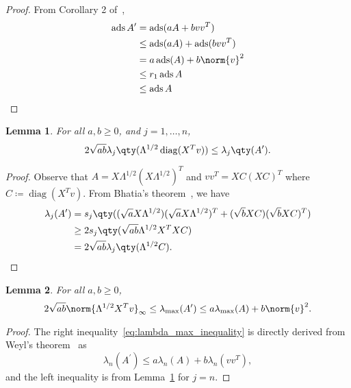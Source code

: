 \documentclass[nobib]{my-handout}
\newtheorem{lemma}{Lemma}
\theoremstyle{definition}
\theoremstyle{remark}
\DeclareMathOperator{\ads}{ads}
\DeclareMathOperator{\diag}{diag}
\begin{document}
\begin{proof}
	From Corollary 2 of~\cite{merikoski_inequalities_2004},
	\begin{equation*}
		\begin{aligned}
			\ads{A^\prime} &= \ads(a A + b v v^T) \\
										 &\le \ads(a A) + \ads(b v v^T) \\
										 &= a \ads(A) + b \norm{v}^2 \\
										 &\le r_1 \ads{A} \\
										 &\le \ads{A}
		\end{aligned}
	\end{equation*}
\end{proof}

\begin{lemma}\label{lem:mod_bhatia}
	For all $a, b \ge 0$, and $j=1,\dotsc,n$,
	\begin{equation*}
		2 \sqrt{ab} \lambda_j \qty(\Lambda^{1/2} \diag(X^T v)) \le
		\lambda_j \qty(A^\prime).
	\end{equation*}
\end{lemma}

\begin{proof}
	Observe that $A = X \Lambda^{1/2} (X \Lambda^{1/2})^T$ and $v v^T = X C (X
	C)^T$ where $C \coloneqq \diag(X^T v)$. From Bhatia's
	theorem~\cite{bhatia_singular_1990}, we have 
	\begin{equation*}
		\begin{aligned}
			\lambda_j (A^\prime)
			&= s_j \qty((\sqrt{a} X \Lambda^{1/2})(\sqrt{a} X \Lambda^{1/2})^T +
			(\sqrt{b} X C)(\sqrt{b} X C)^T) \\
			&\ge 2 s_j \qty(\sqrt{ab} \Lambda^{1/2} X^T X C) \\
			&= 2 \sqrt{ab} \lambda_j \qty(\Lambda^{1/2} C).
		\end{aligned}
	\end{equation*}
\end{proof}

\begin{lemma}\label{lem:bounding_lambda_max}
	For all $a, b \ge 0$,
	\begin{equation}\label{eq:lambda_max_inequality}
		2 \sqrt{ab} \norm{\Lambda^{1/2} X^T v}_{\infty} \le
		\lambda_{\max}(A^\prime) \le a \lambda_{\max}(A) + b \norm{v}^2.
	\end{equation}
\end{lemma}

\begin{proof}
	The right inequality~\eqref{eq:lambda_max_inequality} is directly derived
	from Weyl's theorem~\cite{horn_matrix_2012} as
	\begin{equation*}
		\lambda_n(A^\prime) \le a \lambda_n(A) + b \lambda_n(v v^T),
	\end{equation*}
	and the left inequality is from Lemma~\ref{lem:mod_bhatia} for $j = n$. 
\end{proof}
	
\end{document}
